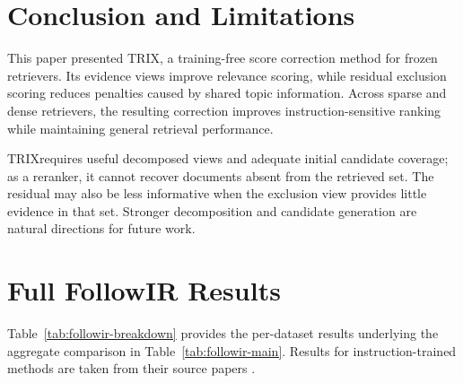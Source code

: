 \documentclass[letterpaper]{article}
\newcommand{\method}{\ifmmode \mathrm{TRIX}\else TRIX\xspace\fi}
\begin{document}
\section{Conclusion and Limitations}
\label{sec:conclusion}

This paper presented \method{}, a training-free score correction method for
frozen retrievers.  Its evidence views improve relevance scoring, while
residual exclusion scoring reduces penalties caused by shared topic
information.  Across sparse and dense retrievers, the resulting correction
improves instruction-sensitive ranking while maintaining general retrieval
performance.

\method requires useful decomposed views and adequate initial candidate
coverage; as a reranker, it cannot recover documents absent from the retrieved
set.  The residual may also be less informative when the exclusion view
provides little evidence in that set.  Stronger decomposition and candidate
generation are natural directions for future work.

{\small

}

\clearpage
\appendix

\section{Full FollowIR Results}
\label{app:followir-breakdown}

Table~\ref{tab:followir-breakdown} provides the per-dataset results
underlying the aggregate comparison in Table~\ref{tab:followir-main}.
Results for instruction-trained methods are taken from their source papers
\cite{DBLP:conf/naacl/WellerCMLCDLS25,DBLP:conf/iclr/WellerDLPZH25,
gao2026instemb}.
\end{document}
